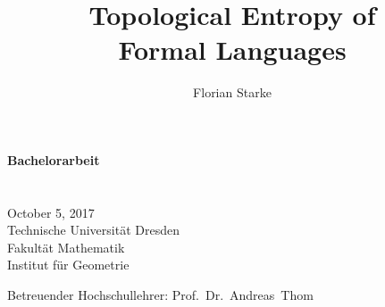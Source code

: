 \title{Topological Entropy of\\Formal Languages}
\author{Florian Starke}

	\begin{titlepage}
		\vspace*{\bigskipamount}
		\begin{center}
			\makeatletter
			\noindent
			\LARGE \textbf{Bachelorarbeit}                 \\[ 4   ex]
			\huge  \textbf{\@title}                     \\[10   ex]
			\Large \textbf{\@author}                    \\[ 1 ex]
			\Large October 5, 2017                     \\[ 6   ex]
			\LARGE Technische Universität Dresden        \\
			\Large Fakultät Mathematik                   \\
			       Institut für Geometrie  
			\makeatother
		\end{center}
		\vfill
		\begin{flushleft}
			\noindent
			\Large
			Betreuender Hochschullehrer: Prof.\ Dr.\ Andreas~Thom   \\
		\end{flushleft}
	\end{titlepage}
	\thispagestyle{empty}\mbox{}
	\clearpage

